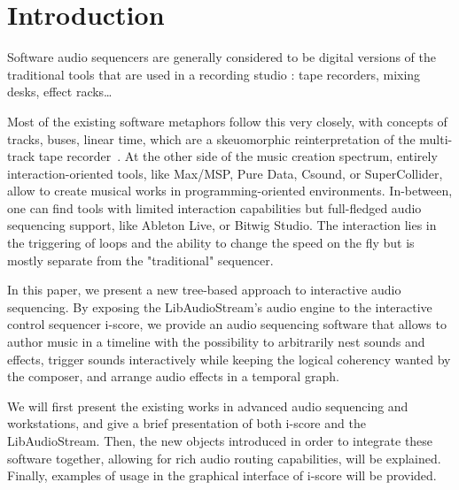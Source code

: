 \documentclass{article}
\title{\papertitle}
\begin{document}
%
\capstartfalse
\maketitle
\capstarttrue
%
\begin{abstract}
Place your abstract at the top left column on the first page.
Please write about 150--200 words that specifically highlight the purpose of your work,
its context, and provide a brief synopsis of your results.
Avoid equations in this part.
\end{abstract}

\section{Introduction}
Software audio sequencers are generally considered to be digital versions 
of the traditional tools that are used in a recording studio : tape recorders, 
mixing desks, effect racks\dots

Most of the existing software metaphors follow this very closely, with 
concepts of tracks, buses, linear time, which are a skeuomorphic reinterpretation of the multi-track tape recorder~\cite{bell2015skeuomorphism}.
At the other side of the music creation spectrum, entirely interaction-oriented tools, 
like Max/MSP, Pure Data, Csound, or SuperCollider, allow to create musical works in programming-oriented 
environments.
In-between, one can find tools with limited interaction capabilities but full-fledged audio sequencing support, 
like Ableton Live, or Bitwig Studio.
The interaction lies in the triggering of loops and the ability to change the speed on the fly but is mostly separate from the "traditional" sequencer.

In this paper, we present a new tree-based approach to interactive audio sequencing.
By exposing the LibAudioStream's audio engine to the interactive control sequencer i-score, 
we provide an audio sequencing software that allows to author music in a timeline 
with the possibility to arbitrarily nest sounds and effects, trigger sounds interactively 
while keeping the logical coherency wanted by the composer, and arrange audio effects in a temporal graph.

We will first present the existing works in advanced audio sequencing and workstations, 
and give a brief presentation of both i-score and the LibAudioStream.
Then, the new objects introduced in order to integrate these software together, allowing 
for rich audio routing capabilities, will be explained.
Finally, examples of usage in the graphical interface of i-score will be provided.
\end{document}
